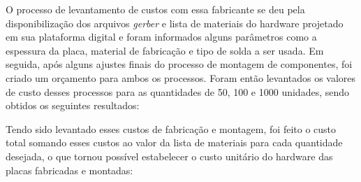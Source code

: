 O processo de levantamento de custos com essa fabricante se deu pela disponibilização dos arquivos \textit{gerber} e lista de materiais do hardware projetado em sua plataforma digital e foram informados alguns parâmetros como a espessura da placa, material de fabricação e tipo de solda a ser usada. Em seguida, após alguns ajustes finais do processo de montagem de componentes, foi criado um orçamento para ambos os processos. Foram então levantados os valores de custo desses processos para as quantidades de 50, 100 e 1000 unidades, sendo obtidos os seguintes resultados:

	\begin{table}[!h]
	\captionsetup{width=7cm}%
    \end{table}
\newpage
Tendo sido levantado esses custos de fabricação e montagem, foi feito o custo total somando esses custos ao valor da lista de materiais para cada quantidade desejada, o que tornou possível estabelecer o custo unitário do hardware das placas fabricadas e montadas:


	\begin{table}[!h]
	\captionsetup{width=7cm}%
    \end{table}


